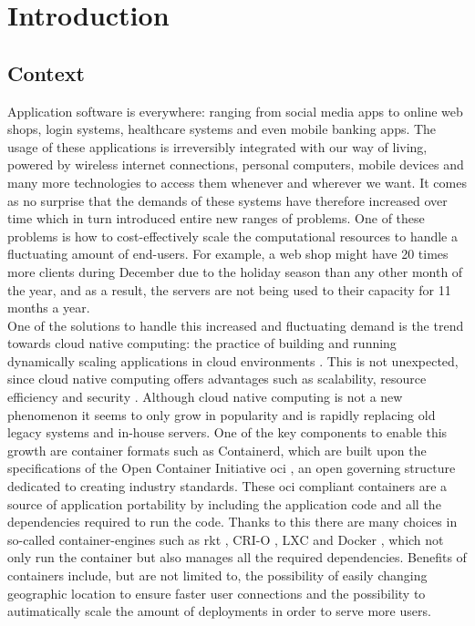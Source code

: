 \chapter{Introduction}                                 \label{ch:introduction}
\section{Context}  \label{sec:context}
Application software is everywhere: ranging from social media apps to online web shops, login systems, healthcare systems and even mobile banking apps. The usage of these applications is irreversibly integrated with our way of living, powered by wireless internet connections, personal computers, mobile devices and many more technologies to access them whenever and wherever we want. It comes as no surprise that the demands of these systems have therefore increased over time which in turn introduced entire new ranges of problems. One of these problems is how to cost-effectively scale the computational resources to handle a fluctuating amount of end-users. For example, a web shop might have 20 times more clients during December due to the holiday season than any other month of the year, and as a result, the servers are not being used to their capacity for 11 months a year.
\\[10pt]

 One of the solutions to handle this increased and fluctuating demand is the trend towards cloud native computing: the practice of building and running dynamically scaling applications in cloud environments \cite{CNCF}. This is not unexpected, since cloud native computing offers advantages such as scalability, resource efficiency and security \cite{cnci4}. Although cloud native computing is not a new phenomenon it seems to only grow in popularity \cite{CNCFSurvey} and is rapidly replacing old legacy systems and in-house servers. One of the key components to enable this growth are container formats such as Containerd, which are built upon the specifications of the Open Container Initiative \acrshort{oci} \cite{OCI}, an open governing structure dedicated to creating industry standards. These \acrshort{oci} compliant containers are a source of application portability by including the application code and all the dependencies required to run the code. Thanks to this there are many choices in so-called container-engines such as rkt \cite{rkt}, CRI-O \cite{crio}, LXC \cite{LXC} and Docker \cite{Bernstein2014}, which not only run the container but also manages all the required dependencies. Benefits of containers include, but are not limited to, the possibility of easily changing geographic location to ensure faster user connections and the possibility to autimatically scale the amount of deployments in order to serve more users. 
\\[10pt]

